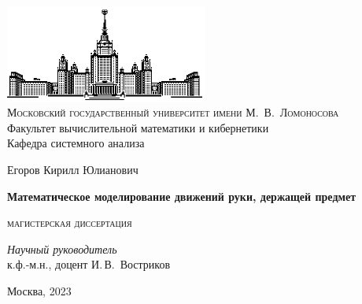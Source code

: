 \thispagestyle{empty}
\begin{center}
    \ \vspace{-3cm}

    \includegraphics[width=0.5\textwidth]{title_page/msu.eps}\\

    {\small{\scshape  Московский государственный университет имени М.~В.~Ломоносова}\\
    Факультет вычислительной математики и кибернетики\\
    Кафедра системного анализа}

    \vfill

    {\Large Егоров Кирилл Юлианович}

    \vspace{1cm}

    {\LARGE\bfseries Математическое моделирование движений руки,
    держащей предмет}

    \vspace{1.5cm}

    {\scshape магистерская диссертация}
\end{center}

\vspace{3cm}

\begin{flushright}
    \large
    \textit{Научный руководитель}\\
    к.ф.-м.н., доцент И.\,В.~Востриков
\end{flushright}

\vfill

\begin{center}
    Москва, 2023
\end{center}

\clearpage